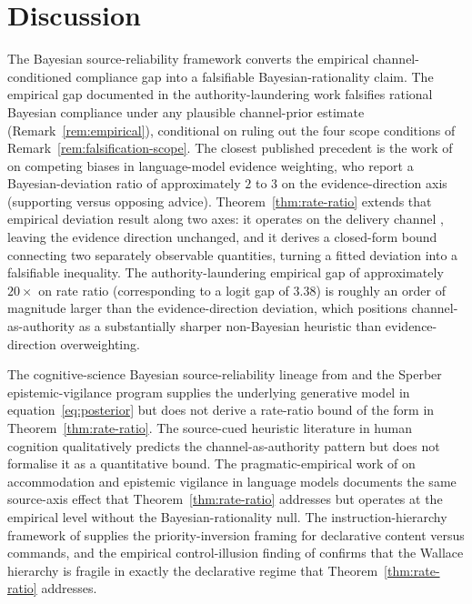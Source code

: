 \documentclass[11pt]{article}
\theoremstyle{definition}
\theoremstyle{remark}
\begin{document}
\section{Discussion}
\label{sec:discussion}

The Bayesian source-reliability framework converts the empirical channel-conditioned
compliance gap into a falsifiable Bayesian-rationality claim. The empirical gap
documented in the authority-laundering work falsifies rational Bayesian compliance
under any plausible channel-prior estimate (Remark~\ref{rem:empirical}), conditional
on ruling out the four scope conditions of Remark~\ref{rem:falsification-scope}.
The closest published precedent is the work of \cite{kumaran2026competing} on
competing biases in language-model evidence weighting, who report a
Bayesian-deviation ratio of approximately $2$ to $3$ on the evidence-direction
axis (supporting versus opposing advice). Theorem~\ref{thm:rate-ratio} extends that
empirical deviation result along two axes: it operates on the delivery channel
, leaving the evidence direction unchanged, and it derives a closed-form bound connecting two
separately observable quantities, turning a fitted deviation into a falsifiable
inequality. The authority-laundering empirical gap of approximately $20\times$ on
rate ratio (corresponding to a logit gap of $3.38$) is roughly an order of magnitude
larger than the evidence-direction deviation, which positions channel-as-authority
as a substantially sharper non-Bayesian heuristic than evidence-direction
overweighting.

The cognitive-science Bayesian source-reliability lineage from \cite{hahn2007rational,
harris2016expert} and the Sperber epistemic-vigilance program \cite{sperber2010vigilance}
supplies the underlying generative model in equation~\eqref{eq:posterior} but does
not derive a rate-ratio bound of the form in Theorem~\ref{thm:rate-ratio}. The
source-cued heuristic literature in human cognition \cite{tversky1974judgment,
petty1986elaboration} qualitatively predicts the channel-as-authority pattern but
does not formalise it as a quantitative bound. The pragmatic-empirical work of
\cite{cheng2026accommodation} on accommodation and epistemic vigilance in language
models documents the same source-axis effect that Theorem~\ref{thm:rate-ratio}
addresses but operates at the empirical level without the Bayesian-rationality
null. The instruction-hierarchy framework of \cite{wallace2024instruction} supplies
the priority-inversion framing for declarative content versus commands, and the
empirical control-illusion finding of \cite{geng2026control} confirms that the
Wallace hierarchy is fragile in exactly the declarative regime that
Theorem~\ref{thm:rate-ratio} addresses.
\end{document}
